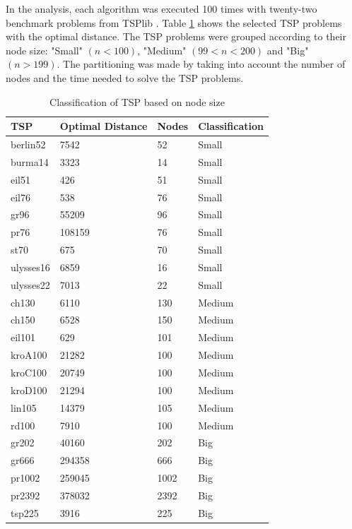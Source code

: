 \documentclass[conference]{IEEEtran}
\begin{document}
	In the analysis, each algorithm was executed 100 times with twenty-two benchmark problems from TSPlib \cite{tsplib2019}. Table \ref{tab:tspgroupbynodesize} shows the selected TSP problems with the optimal distance. The TSP problems were grouped according to their node size: "Small" $(n<100)$, "Medium" $(99<n<200)$ and "Big" $(n>199)$. The partitioning was made by taking into account the number of nodes and the time needed to solve the TSP problems. 
	\begin{table}[H]
	    \centering
	    \begin{tabular}{ | l | l | l | l | }
	         \hline
        	TSP & Optimal Distance & Nodes & Classification \\ \hline \hline
        	berlin52 & 7542 & 52 & Small \\ \hline
        	burma14 & 3323 & 14 & Small \\ \hline
        	eil51 & 426 & 51 & Small \\ \hline
        	eil76 & 538 & 76 & Small \\ \hline
        	gr96 & 55209 & 96 & Small \\ \hline
        	pr76 & 108159 & 76 & Small \\ \hline
        	st70 & 675 & 70 & Small \\ \hline
        	ulysses16 & 6859 & 16 & Small \\ \hline
        	ulysses22 & 7013 & 22 & Small \\ \hline
        	ch130 & 6110 & 130 & Medium \\ \hline
        	ch150 & 6528 & 150 & Medium \\ \hline
        	eil101 & 629 & 101 & Medium \\ \hline
        	kroA100 & 21282 & 100 & Medium \\ \hline
        	kroC100 & 20749 & 100 & Medium \\ \hline
        	kroD100 & 21294 & 100 & Medium \\ \hline
        	lin105 & 14379 & 105 & Medium \\ \hline
        	rd100 & 7910 & 100 & Medium \\ \hline
        	gr202 & 40160 & 202 & Big \\ \hline
        	gr666 & 294358 & 666 & Big \\ \hline
        	pr1002 & 259045 & 1002 & Big \\ \hline
        	pr2392 & 378032 & 2392 & Big \\ \hline
        	tsp225 & 3916 & 225 & Big \\ \hline
	    \end{tabular}
	    \caption{Classification of TSP based on node size}
	    \label{tab:tspgroupbynodesize}
	\end{table}
\end{document}

